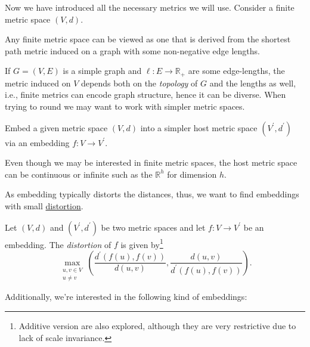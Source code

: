 Now we have introduced all the necessary metrics we will use. Consider a finite metric space \((V, d)\).

\begin{claim}
	Any finite metric space can be viewed as one that is derived from the shortest path metric induced on a graph with some non-negative edge lengths.
\end{claim}

If \(G = (V, E)\) is a simple graph and \(\ell \colon E \to \mathbb{R} _{+}\) are some edge-lengths, the metric induced on \(V\) depends both on the \emph{topology} of \(G\) and the lengths as well, i.e., finite metrics can encode graph structure, hence it can be diverse. When trying to round we may want to work with simpler metric spaces.

\begin{intuition}[Embedding]
	Embed a given metric space \((V, d)\) into a simpler host metric space \((V^{\prime} , d^{\prime} )\) via an embedding \(f \colon V \to V^{\prime} \).
\end{intuition}

\begin{note}
	Even though we may be interested in finite metric spaces, the host metric space can be continuous or infinite such as the \(\mathbb{R} ^h\) for dimension \(h\).
\end{note}

As embedding typically distorts the distances, thus, we want to find embeddings with small \hyperref[def:distortion]{distortion}.

\begin{definition}[Distortion]\label{def:distortion}
	Let \((V, d)\) and \((V^{\prime} , d^{\prime} )\) be two metric spaces and let \(f \colon V \to V^{\prime} \) be an embedding. The \emph{distortion} of \(f\) is given by\footnote{Additive version are also explored, although they are very restrictive due to lack of scale invariance.}
	\[
		\max _{\substack{u, v \in V \\ u \neq v}} \left( \frac{d^{\prime} (f(u), f(v))}{d(u, v)} , \frac{d(u, v)}{d^{\prime} (f(u), f(v))}\right) .
	\]
\end{definition}

Additionally, we're interested in the following kind of embeddings:

